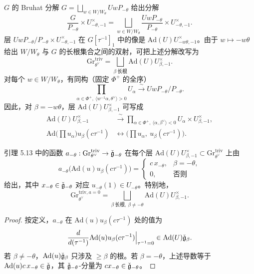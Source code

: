 $G$ 的 Bruhat 分解 $G=\bigsqcup_{w\in W/W_\theta}UwP_{-\theta}$ 给出分解
\[
\frac{G}{P_{-\theta}}\times U^\times_{-\theta,-1}=\bigsqcup_{w\in W/W_\theta}\frac{UwP_{-\theta}}{P_{-\theta}}\times U^\times_{-\theta,-1}.
\]
层 $UwP_{-\theta}/P_{-\theta}\times U^\times_{-\theta,-1}$ 在 $G[\tau^{-1}]_1$ 中的像是 $\mathrm{Ad}(U)U^\times_{-w\theta,-1}$。由于 $w\mapsto-w\theta$ 给出 $W/W_\theta$ 与 $G$ 的长根集合之间的双射，可把上述分解改写为
\[
\mathrm{Gr}^{\mathrm{triv}}_{\theta^\vee}=\bigsqcup_{\beta\ \text{长根}}\mathrm{Ad}(U)U^\times_{\beta,-1}.
\]
对每个 $w\in W/W_\theta$，有同构（固定 $\Phi^+$ 的全序）
\[
\prod_{\alpha\in\Phi^+,\ \langle w^{-1}\alpha,\theta^\vee\rangle>0}U_\alpha\xrightarrow{\ \sim\ }UwP_{-\theta}/P_{-\theta}.
\]
因此，对 $\beta=-w\theta$，层 $\mathrm{Ad}(U)U^\times_{\beta,-1}$ 可写成
\begin{equation}
\begin{aligned}
\mathrm{Ad}(U)U^\times_{\beta,-1}&\xrightarrow{\ \sim\ }\prod_{\alpha\in\Phi^+,\ \langle\alpha,\beta^\vee\rangle<0}U_\alpha\times U^\times_{\beta,-1},\\
\mathrm{Ad}\Big(\prod u_\alpha\Big)u_\beta(c\tau^{-1})&\leftrightarrow\Big(\prod u_\alpha,\ u_\beta(c\tau^{-1})\Big).
\end{aligned}
\end{equation}

\begin{lemma}
引理 5.13 中的函数 $a_{-\theta}:\mathrm{Gr}^{\mathrm{triv}}_{\theta^\vee}\to\check{\mathfrak g}_{-\theta}$ 在每个层 $\mathrm{Ad}(U)U^\times_{\beta,-1}\subset\mathrm{Gr}^{\mathrm{triv}}_{\theta^\vee}$ 上由
\[
a_{-\theta}\big(\mathrm{Ad}(u)u_\beta(c\tau^{-1})\big)=
\begin{cases}
c\,x_{-\theta},&\beta=-\theta,\\
0,&\text{否则}
\end{cases}
\]
给出，其中 $x_{-\theta}\in\check{\mathfrak g}_{-\theta}$ 对应 $u_{-\theta}(1)\in U_{-\theta}$。特别地，
\begin{equation}
\mathrm{Gr}^{\mathrm{triv},a=0}_{\theta^\vee}=\bigsqcup_{\beta\ \text{长根},\ \beta\neq-\theta}\mathrm{Ad}(U)U^\times_{\beta,-1}.
\end{equation}
\end{lemma}

\begin{proof}
按定义，$a_{-\theta}$ 在 $\mathrm{Ad}(u)u_\beta(c\tau^{-1})$ 处的值为
\[
\frac{d}{d(\tau^{-1})}\mathrm{Ad}(u)u_\beta(c\tau^{-1})\Big|_{\tau^{-1}=0}\in\mathrm{Ad}(U)\check{\mathfrak g}_\beta.
\]
若 $\beta\neq-\theta$，$\mathrm{Ad}(u)\check{\mathfrak g}_\beta$ 只涉及 $\ge\beta$ 的根。若 $\beta=-\theta$，上述导数等于 $\mathrm{Ad}(u)c\,x_{-\theta}\in\check{\mathfrak g}$，其 $\check{\mathfrak g}_{-\theta}$-分量为 $cx_{-\theta}\in\check{\mathfrak g}_{-\theta}$。
\end{proof}

